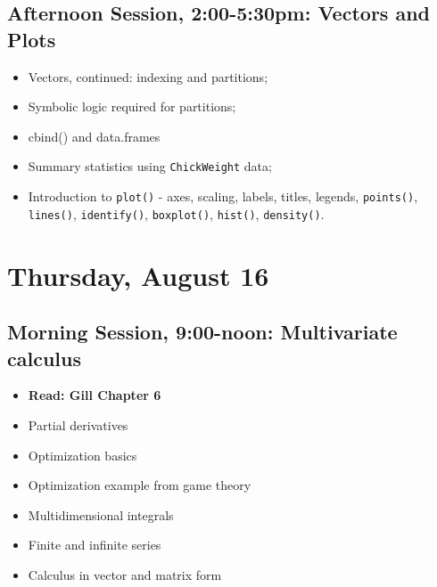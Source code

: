 \documentclass[12pt,a4paper]{article}
\begin{document}
\subsection*{Afternoon Session, 2:00-5:30pm: Vectors and Plots}
\begin{itemize}
\setlength{\itemsep}{0pt}
\footnotesize
\item Vectors, continued: indexing and partitions;
\item Symbolic logic required for partitions;
\item cbind() and data.frames
\item Summary statistics using \texttt{ChickWeight} data;
\item Introduction to \texttt{plot()} - axes, scaling, labels, titles, legends, \texttt{points()}, \texttt{lines()}, \texttt{identify()}, \texttt{boxplot()}, \texttt{hist()}, \texttt{density()}.
\end{itemize}


\section*{Thursday, August 16}

\subsection*{Morning Session, 9:00-noon: Multivariate calculus}
\begin{itemize}
\setlength{\itemsep}{0pt}
\footnotesize
\item \textbf{Read: Gill Chapter 6}
\item Partial derivatives
\item Optimization basics
\item Optimization example from game theory
\item Multidimensional integrals
\item Finite and infinite series
\item Calculus in vector and matrix form


\end{itemize}
\end{document}
